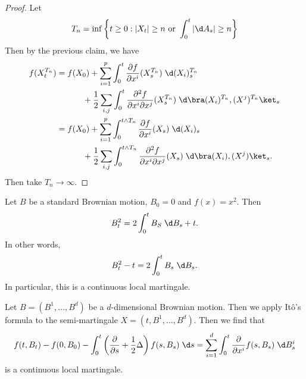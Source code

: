 \documentclass[a4paper]{article}
\begin{document}
\begin{proof}
  Let
  \[
    T_n = \inf \left\{t \geq 0: |X_t| \geq n\text{ or }\int_0^t |\d A_s| \geq n\right\}
  \]
  Then by the previous claim, we have
  \begin{align*}
    f(X_t^{T_n}) &= f(X_0) + \sum_{i = 1}^p \int_0^t \frac{\partial f}{\partial x^i} (X_s^{T_n})\;\d (X_i)_s^{T_n} \\
    &\hphantom{aaaaaa}+ \frac{1}{2} \sum_{i, j} \int_0^t \frac{\partial^2 f}{\partial x^i \partial x^j} (X_s^{T_n})\;\d \bra (X_i)^{T_n}, (X^j)^{T_n}\ket_s\\
    &= f(X_0) + \sum_{i = 1}^p \int_0^{t \wedge T_n} \frac{\partial f}{\partial x^i} (X_s)\;\d (X_i)_s \\
    &\hphantom{aaaaaa}+ \frac{1}{2} \sum_{i, j} \int_0^{t \wedge T_n} \frac{\partial^2 f}{\partial x^i \partial x^j} (X_s)\;\d \bra (X_i), (X^j)\ket_s.
  \end{align*}
  Then take $T_n \to \infty$.
\end{proof}

\begin{eg}
  Let $B$ be a standard Brownian motion, $B_0 = 0$ and $f(x) = x^2$. Then
  \[
    B_t^2 = 2 \int_0^t B_S \;\d B_s + t.
  \]
  In other words,
  \[
    B_t^2 - t = 2 \int_0^t B_s\;\d B_s.
  \]
  In particular, this is a continuous local martingale.
\end{eg}

\begin{eg}
  Let $B = (B^1, \ldots, B^d)$ be a $d$-dimensional Brownian motion. Then we apply It\^o's formula to the semi-martingale $X = (t, B^1, \ldots, B^d)$. Then we find that
  \[
    f(t, B_t) - f(0, B_0) - \int_0^t \left(\frac{\partial}{\partial s} + \frac{1}{2} \Delta\right) f(s, B_s) \;\d s = \sum_{i = 1}^d \int_0^t \frac{\partial}{\partial x^i} f(s, B_s)\;\d B_s^i
  \]
  is a continuous local martingale.
\end{eg}
\end{document}
